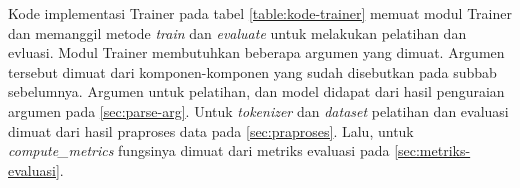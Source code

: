Kode implementasi Trainer pada tabel \ref{table:kode-trainer} memuat modul Trainer dan memanggil metode \textit{train} dan \textit{evaluate} untuk melakukan pelatihan dan evluasi. Modul Trainer membutuhkan beberapa argumen yang dimuat. Argumen tersebut dimuat dari komponen-komponen yang sudah disebutkan pada subbab sebelumnya. Argumen untuk pelatihan, dan model didapat dari hasil penguraian argumen pada \ref{sec:parse-arg}. Untuk \textit{tokenizer} dan \textit{dataset} pelatihan dan evaluasi dimuat dari hasil praproses data pada \ref{sec:praproses}. Lalu, untuk \textit{compute\_metrics} fungsinya dimuat dari metriks evaluasi pada \ref{sec:metriks-evaluasi}. 
